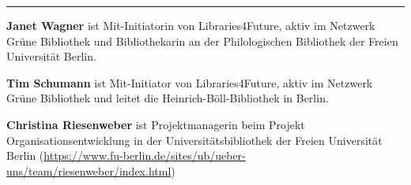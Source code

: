 \begin{center}\rule{0.5\linewidth}{0.5pt}\end{center}

\textbf{Janet Wagner} ist Mit-Initiatorin von Libraries4Future, aktiv im
Netzwerk Grüne Bibliothek und Bibliothekarin an der Philologischen
Bibliothek der Freien Universität Berlin.

\textbf{Tim Schumann} ist Mit-Initiator von Libraries4Future, aktiv im
Netzwerk Grüne Bibliothek und leitet die Heinrich-Böll-Bibliothek in
Berlin.

\textbf{Christina Riesenweber} ist Projektmanagerin beim Projekt
Organisationsentwicklung in der Universitätsbibliothek der Freien
Universität Berlin
(\url{https://www.fu-berlin.de/sites/ub/ueber-uns/team/riesenweber/index.html})

